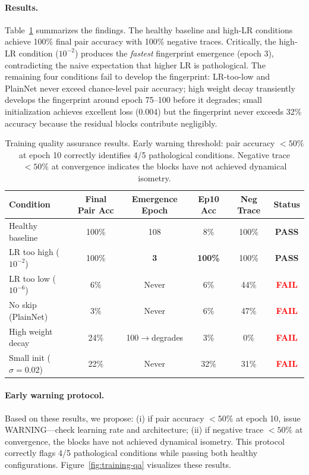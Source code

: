 \documentclass[wcp]{jmlr}
\begin{document}
\paragraph{Results.} Table~\ref{tab:training-qa} summarizes the findings. The healthy baseline and high-LR conditions achieve 100\% final pair accuracy with 100\% negative traces. Critically, the high-LR condition ($10^{-2}$) produces the \emph{fastest} fingerprint emergence (epoch 3), contradicting the naive expectation that higher LR is pathological. The remaining four conditions fail to develop the fingerprint: LR-too-low and PlainNet never exceed chance-level pair accuracy; high weight decay transiently develops the fingerprint around epoch 75--100 before it degrades; small initialization achieves excellent loss (0.004) but the fingerprint never exceeds 32\% accuracy because the residual blocks contribute negligibly.

\begin{table}[h]
\centering
\small
\renewcommand{\arraystretch}{1.05}
\begin{tabular}{lccccc}
\toprule
Condition & Final Pair Acc & Emergence Epoch & Ep10 Acc & Neg Trace & Status \\
\midrule
Healthy baseline & 100\% & 108 & 8\% & 100\% & \textcolor{green!60!black}{\textbf{PASS}} \\
LR too high ($10^{-2}$) & 100\% & \textbf{3} & \textbf{100\%} & 100\% & \textcolor{green!60!black}{\textbf{PASS}} \\
\midrule
LR too low ($10^{-6}$) & 6\% & Never & 6\% & 44\% & \textcolor{red}{\textbf{FAIL}} \\
No skip (PlainNet) & 3\% & Never & 6\% & 47\% & \textcolor{red}{\textbf{FAIL}} \\
High weight decay & 24\% & 100$\to$degrades & 3\% & 0\% & \textcolor{red}{\textbf{FAIL}} \\
Small init ($\sigma{=}0.02$) & 22\% & Never & 32\% & 31\% & \textcolor{red}{\textbf{FAIL}} \\
\bottomrule
\end{tabular}
\caption{Training quality assurance results. Early warning threshold: pair accuracy $<50\%$ at epoch 10 correctly identifies 4/5 pathological conditions. Negative trace $<50\%$ at convergence indicates the blocks have not achieved dynamical isometry.}
\label{tab:training-qa}
\end{table}

\paragraph{Early warning protocol.} Based on these results, we propose: (i) if pair accuracy $<50\%$ at epoch 10, issue WARNING---check learning rate and architecture; (ii) if negative trace $<50\%$ at convergence, the blocks have not achieved dynamical isometry. This protocol correctly flags 4/5 pathological conditions while passing both healthy configurations. Figure~\ref{fig:training-qa} visualizes these results.
\end{document}
